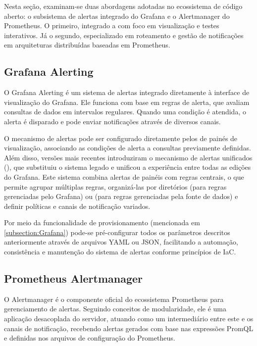 Nesta seção, examinam-se duas abordagens adotadas no ecossistema de código aberto: o subsistema de alertas integrado do Grafana e o Alertmanager do Prometheus. O primeiro, integrado a  com foco em visualização e testes interativos. Já o segundo, especializado em roteamento e gestão de notificações em arquiteturas distribuídas baseadas em Prometheus.

\subsection{Grafana Alerting}
\label{subsection:GrafanaAlerting}

O Grafana Alerting \citep{grafanaalerting2025} é um sistema de alertas integrado diretamente à interface de visualização do Grafana. Ele funciona com base em regras de alerta, que avaliam consultas de dados em intervalos regulares. Quando uma condição é atendida, o alerta é disparado e pode enviar notificações através de diversos canais.

O mecanismo de alertas pode ser configurado diretamente pelos de painés de visualização, associando as condições de alerta a consultas previamente definidas. Além disso, versões mais recentes introduziram o mecanismo de alertas unificados (), que substituiu o sistema legado e unificou a experiência entre todas as edições do Grafana. Este sistema combina alertas de painéis com regras centrais, o que permite agrupar múltiplas regras, organizá-las por diretórios (para regras gerenciadas pelo Grafana) ou  (para regras gerenciadas pela fonte de dados) e definir políticas e canais de notificação variados.

Por meio da funcionalidade de provisionamento (mencionada em \ref{subsection:Grafana}) pode-se pré-configurar todos os parâmetros descritos anteriormente através de arquivos YAML ou JSON, facilitando a automação, consistência e manutenção do sistema de alertas conforme princípios de IaC.

\subsection{Prometheus Alertmanager}
\label{subsection:PrometheusAlertmanager}

O Alertmanager \citep{promalertmanager2025}
é o componente oficial do ecossistema Prometheus para gerenciamento de alertas. Seguindo conceitos de modularidade, ele é uma aplicação desacoplada do servidor, atuando como um intermediário entre este e os canais de notificação, recebendo alertas gerados com base nas expressões PromQL e definidas nos arquivos de configuração do Prometheus.

